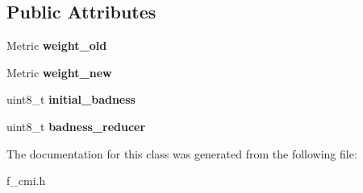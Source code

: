 \subsection*{Public Attributes}
\begin{DoxyCompactItemize}
\item 
\mbox{\label{classanalyzer_1_1_channelling_measurement_interpreter_1_1_configuration_a0e929eb21d819475e31746a81819a369}} 
Metric {\bfseries weight\+\_\+old}
\item 
\mbox{\label{classanalyzer_1_1_channelling_measurement_interpreter_1_1_configuration_a4afebbb67b7dd5cbd1998ce72fd6d746}} 
Metric {\bfseries weight\+\_\+new}
\item 
\mbox{\label{classanalyzer_1_1_channelling_measurement_interpreter_1_1_configuration_ab1094ff731fcfc506e8a790ad437c066}} 
uint8\+\_\+t {\bfseries initial\+\_\+badness}
\item 
\mbox{\label{classanalyzer_1_1_channelling_measurement_interpreter_1_1_configuration_aab70d4d742498ce183844770a6fd378f}} 
uint8\+\_\+t {\bfseries badness\+\_\+reducer}
\end{DoxyCompactItemize}


The documentation for this class was generated from the following file\+:\begin{DoxyCompactItemize}
\item 
f\+\_\+cmi.\+h\end{DoxyCompactItemize}
